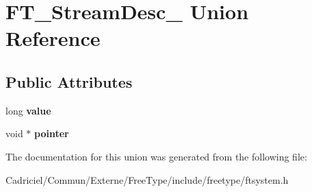 \hypertarget{union_f_t___stream_desc__}{\section{F\-T\-\_\-\-Stream\-Desc\-\_\- Union Reference}
\label{union_f_t___stream_desc__}
}
\subsection*{Public Attributes}
\begin{DoxyCompactItemize}
\item 
\hypertarget{union_f_t___stream_desc___a1a94493032faef1c3ed7bc33816ce90c}{long {\bfseries value}}\label{union_f_t___stream_desc___a1a94493032faef1c3ed7bc33816ce90c}

\item 
\hypertarget{union_f_t___stream_desc___a410ed102dc377fb9a5b9c950c3f863dc}{void $\ast$ {\bfseries pointer}}\label{union_f_t___stream_desc___a410ed102dc377fb9a5b9c950c3f863dc}

\end{DoxyCompactItemize}


The documentation for this union was generated from the following file\-:\begin{DoxyCompactItemize}
\item 
Cadriciel/\-Commun/\-Externe/\-Free\-Type/include/freetype/ftsystem.\-h\end{DoxyCompactItemize}
